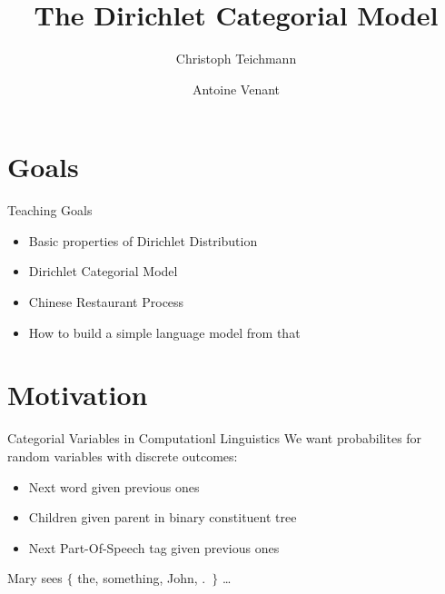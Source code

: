 \documentclass[11pt]{beamer}
\author{Christoph Teichmann \and Antoine Venant}
\title{The Dirichlet Categorial Model}
\subtitle{}
\institute{}
\date{}
\begin{document}
	
	
	\begin{frame}
		\maketitle
	\end{frame}
	
	\section{Goals}
	
	\begin{frame}{Teaching Goals}
		\begin{itemize}
			\item Basic properties of Dirichlet Distribution
			\item Dirichlet Categorial Model
			\item Chinese Restaurant Process
			\item How to build a simple language model from that
		\end{itemize}
	\end{frame}
	
	\section{Motivation}
	
	\begin{frame}{Categorial Variables in Computationl Linguistics}
		\centering
		We want probabilites for random variables with discrete outcomes:
				
		\begin{itemize}
			\item Next word given previous ones
			\item Children given parent in binary constituent tree
			\item Next Part-Of-Speech tag given previous ones
		\end{itemize}
		
		\vspace{20pt} Mary sees $\lbrace$ the, something, John, .\ $\rbrace$ \dots
	\end{frame}
	
\end{document}
